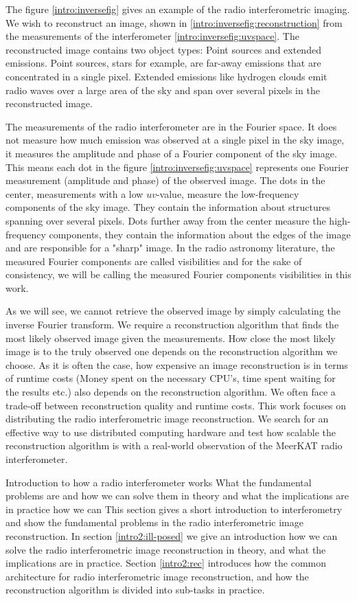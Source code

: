 The figure \ref{intro:inversefig} gives an example of the radio interferometric imaging. We wish to reconstruct an image, shown in \ref{intro:inversefig:reconstruction} from the measurements of the interferometer \ref{intro:inversefig:uvspace}. The reconstructed image contains two object types: Point sources and extended emissions. Point sources, stars for example, are far-away emissions that are concentrated in a single pixel. Extended emissions like hydrogen clouds emit radio waves over a large area of the sky and span over several pixels in the reconstructed image.

The measurements of the radio interferometer are in the Fourier space. It does not measure how much emission was observed at a single pixel in the sky image, it measures the amplitude and phase of a Fourier component of the sky image. This means each dot in the figure \ref{intro:inversefig:uvspace} represents one Fourier measurement (amplitude and phase) of the observed image. The dots in the center, measurements with a low $uv$-value, measure the low-frequency components of the sky image. They contain the information about structures spanning over several pixels. Dots further away from the center measure the high-frequency components, they contain the information about the edges of the image and are responsible for a "sharp" image. In the radio astronomy literature, the measured Fourier components are called visibilities and for the sake of consistency, we will be calling the measured Fourier components visibilities in this work.

As we will see, we cannot retrieve the observed image by simply calculating the inverse Fourier transform. We require a reconstruction algorithm that finds the most likely observed image given the measurements. How close the most likely image is to the truly observed one depends on the reconstruction algorithm we choose. As it is often the case, how expensive an image reconstruction is in terms of runtime costs (Money spent on the necessary CPU's, time spent waiting for the results etc.) also depends on the reconstruction algorithm. We often face a trade-off between reconstruction quality and runtime costs. This work focuses on distributing the radio interferometric image reconstruction. We search for an effective way to use distributed computing hardware and test how scalable the reconstruction algorithm is with a real-world observation of the MeerKAT radio interferometer.

Introduction to how a radio interferometer works
What the fundamental problems are and how we can solve them in theory and what the implications are in practice
how we can 
This section gives a short introduction to interferometry and show the fundamental problems in the radio interferometric image reconstruction. In section \ref{intro2:ill-posed} we give an introduction how we can solve the radio interferometric image reconstruction in theory, and what the implications are in practice. Section \ref{intro2:rec} introduces how the common architecture for radio interferometric image reconstruction, and how the reconstruction algorithm is divided into sub-tasks in practice. 

